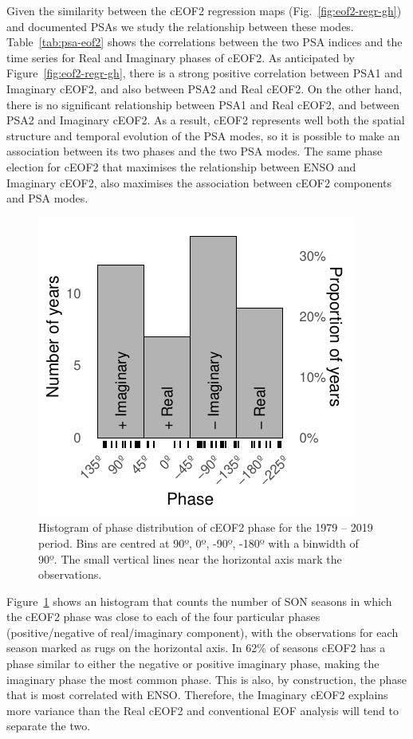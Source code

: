 \documentclass[smallextended]{svjour3}       %
\begin{document}
Given the similarity between the cEOF2 regression maps (Fig.~\ref{fig:eof2-regr-gh}) and documented PSAs we study the relationship between these modes.
Table~\ref{tab:psa-eof2} shows the correlations between the two PSA indices and the time series for Real and Imaginary phases of cEOF2.
As anticipated by Figure~\ref{fig:eof2-regr-gh}, there is a strong positive correlation between PSA1 and Imaginary cEOF2, and also between PSA2 and Real cEOF2.
On the other hand, there is no significant relationship between PSA1 and Real cEOF2, and between PSA2 and Imaginary cEOF2.
As a result, cEOF2 represents well both the spatial structure and temporal evolution of the PSA modes, so it is possible to make an association between its two phases and the two PSA modes.
The same phase election for cEOF2 that maximises the relationship between ENSO and Imaginary cEOF2, also maximises the association between cEOF2 components and PSA modes.



\begin{figure}
\centering
\includegraphics{../figures/phase-histogram-1.pdf}
\caption{\label{fig:phase-histogram}Histogram of phase distribution of cEOF2 phase for the 1979 -- 2019 period. Bins are centred at 90º, 0º, -90º, -180º with a binwidth of 90º. The small vertical lines near the horizontal axis mark the observations.}
\end{figure}

Figure~\ref{fig:phase-histogram} shows an histogram that counts the number of SON seasons in which the cEOF2 phase was close to each of the four particular phases (positive/negative of real/imaginary component), with the observations for each season marked as rugs on the horizontal axis.
In 62\% of seasons cEOF2 has a phase similar to either the negative or positive imaginary phase, making the imaginary phase the most common phase.
This is also, by construction, the phase that is most correlated with ENSO.
Therefore, the Imaginary cEOF2 explains more variance than the Real cEOF2 and conventional EOF analysis will tend to separate the two.
\end{document}
